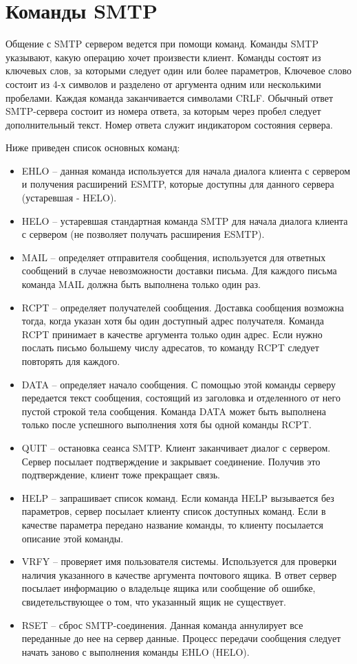 \documentclass[a4paper,12pt]{report}
\begin{document}
	 \section{Команды SMTP}

	 Общение с SMTP сервером ведется при помощи команд. Команды SMTP указывают, какую операцию хочет произвести клиент. Команды состоят из ключевых слов, за которыми следует один или более параметров, Ключевое слово состоит из 4-х символов и разделено от аргумента одним или несколькими пробелами. Каждая команда заканчивается символами CRLF. Обычный ответ SMTP-сервера состоит из номера ответа, за которым через пробел следует дополнительный текст. Номер ответа служит индикатором состояния сервера.

	Ниже приведен список основных команд:

	 \begin{itemize}
		 \item EHLO -- данная команда используется для начала диалога клиента с сервером и получения расширений ESMTP, которые доступны для данного сервера (устаревшая - HELO).
		 \item HELO -- устаревшая стандартная команда SMTP для начала диалога клиента с сервером (не позволяет получать расширения ESMTP).
		 \item MAIL -- определяет отправителя сообщения, используется для ответных сообщений в случае невозможности доставки письма. Для каждого письма команда MAIL должна быть выполнена только один раз.
		 \item RCPT -- определяет получателей сообщения. Доставка сообщения возможна тогда, когда указан хотя бы один доступный адрес получателя. Команда RCPT принимает в качестве аргумента только один адрес. Если нужно послать письмо большему числу адресатов, то команду RCPT следует повторять для каждого.
		 \item DATA -- определяет начало сообщения. С помощью этой команды серверу передается текст сообщения, состоящий из заголовка и отделенного от него пустой строкой тела сообщения. Команда DATA может быть выполнена только после успешного выполнения хотя бы одной команды RCPT.
		 \item QUIT -- остановка сеанса SMTP. Клиент заканчивает диалог с сервером. Сервер посылает подтверждение и закрывает соединение. Получив это подтверждение, клиент тоже прекращает связь.
		 \item HELP -- запрашивает список команд. Если команда HELP вызывается без параметров, сервер посылает клиенту список доступных команд. Если в качестве параметра передано название команды, то клиенту посылается описание этой команды.
		 \item VRFY -- проверяет имя пользователя системы. Используется для проверки наличия указанного в качестве аргумента почтового ящика. В ответ сервер посылает информацию о владельце ящика или сообщение об ошибке, свидетельствующее о том, что указанный ящик не существует.
		 \item RSET -- сброс SMTP-соединения. Данная команда аннулирует все переданные до нее на сервер данные. Процесс передачи сообщения следует начать заново с выполнения команды EHLO (HELO).
	 \end{itemize}
\end{document}
